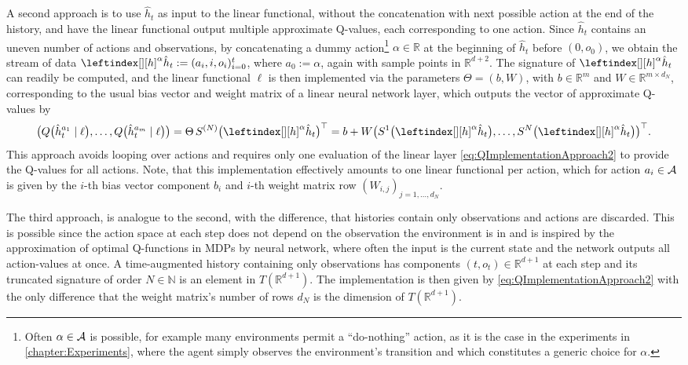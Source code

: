 \documentclass[
    a4paper,
    11pt,
    bibliography=totoc,
    listof=totoc,      
    headinclude=true,
    cleardoublepage=empty,
]{scrbook}
\theoremstyle{plain}
\theoremstyle{definition}
\theoremstyle{remark}
\newcommand{\SetR}{\mathbb R}
\newcommand{\SetN}{\mathbb N}
\newcommand{\SpaceA}{{\cal A}}
\begin{document}
A second approach is to use $\hat{h}_t$ as input to the linear functional, 
without the concatenation with next possible action at the end of the 
history, and have the linear functional output multiple approximate Q-values, 
each corresponding to one action. Since $\hat{h}_t$ contains an uneven number 
of actions and observations, by concatenating a dummy action\footnote{
    Often $\alpha\in\SpaceA$ is possible, for example many environments 
    permit a ``do-nothing'' action, as it is the case in the experiments in 
    \cref{chapter:Experiments}, where the agent simply observes the 
    environment's transition and which constitutes a generic choice for 
    $\alpha$.
} 
$\alpha\in\SetR$ at the beginning of $\hat h_t$ before $(0, o_0)$, we obtain the stream of data $\leftindex[][h]^{\alpha}
{\hat{h}}_t := (a_i,i,o_i)_{i=0}^t$, where $a_0 := \alpha$, again with
sample points in $\SetR^{d+2}$. The signature of $\leftindex[][h]^{\alpha}
{\hat{h}}_t$ can readily be computed, and the linear functional $\ell$ is then
implemented via the parameters $\Theta = (b,W)$, with $b\in\SetR^m$ and
$W\in\SetR^{m\times d_N}$, corresponding to the usual bias vector and weight
matrix of a linear neural network layer, which outputs the vector of approximate 
Q-values by
\begin{equation}
\label{eq:QImplementationApproach2}
    \bigl(
        Q\bigl(\hat{h}^{a_1}_t\mid \ell\bigr),
        \dots, Q\bigl(\hat{h}^{a_m}_t\mid \ell\bigr)
    \bigr)
    = \Theta \, S^{(N)}\bigl(\leftindex[][h]^{\alpha}{\hat{h}}_t\bigr)^\top
    = b + W \bigl(
        S^{1}\bigl(\leftindex[][h]^{\alpha}{\hat{h}}_t\bigr),
        \dots,
        S^{N}\bigl(\leftindex[][h]^{\alpha}{\hat{h}}_t\bigr)
    \bigr)^\top.
\end{equation}
This approach avoids looping over actions and requires only one evaluation of
the linear layer \eqref{eq:QImplementationApproach2} to provide the Q-values
for all actions. Note, that this implementation effectively amounts to one linear
functional per action, which for action $a_i\in\SpaceA$ is given by the $i$-th
bias vector component $b_i$ and $i$-th weight matrix row $(W_{i,j})_{j=1,\dots,
d_N}$.

The third approach, is analogue to the second, with the difference, that
histories contain only observations and actions are discarded. This is
possible since the action space at each step does not depend on the
observation the environment is in and is inspired by the approximation of
optimal Q-functions in MDPs by neural network, where often the input is the
current state and the network outputs all action-values at once. A 
time-augmented history containing only observations has components $(t, o_t) 
\in \SetR^{d+1}$ at each step and its truncated signature of order
$N\in\SetN$ is an element in $T(\SetR^{d+1})$. The implementation is then 
given by \eqref{eq:QImplementationApproach2} with the only difference that 
the weight matrix's number of rows $d_N$ is the dimension of 
$T(\SetR^{d+1})$. 
\end{document}

